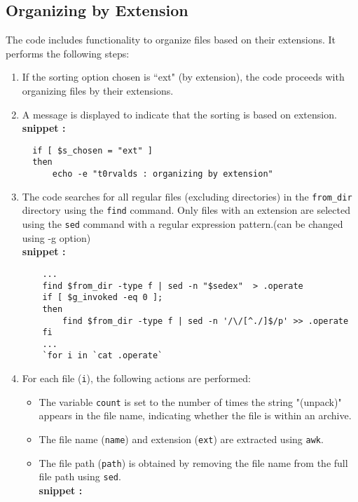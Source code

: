 \documentclass[12pt]{article}
\begin{document}
    \subsection{Organizing by Extension}\label{orgExt}
\begin{flushleft}
The code includes functionality to organize files based on their extensions. It performs the following steps:

    \begin{enumerate}
    \item If the sorting option chosen is ``ext" (by extension), the code proceeds with organizing files by their extensions.
    \item A message is displayed to indicate that the sorting is based on extension.
    \\\textbf{snippet :}
    \begin{verbatim}
  if [ $s_chosen = "ext" ]
  then
      echo -e "t0rvalds : organizing by extension"
    \end{verbatim}    
    \item The code searches for all regular files (excluding directories) in the \texttt{from\_dir} directory using the \texttt{find} command. Only files with an extension are selected using the \texttt{sed} command with a regular expression pattern.(can be changed using -g option)
    \\\textbf{snippet :}
    \begin{verbatim}
    ...
    find $from_dir -type f | sed -n "$sedex"  > .operate
    if [ $g_invoked -eq 0 ];
    then
        find $from_dir -type f | sed -n '/\/[^./]$/p' >> .operate
    fi
    ...
    `for i in `cat .operate`
    \end{verbatim}
    \item For each file (\texttt{i}), the following actions are performed:
        \begin{itemize}
            \item The variable \texttt{count} is set to the number of times the string "(unpack)" appears in the file name, indicating whether the file is within an archive.
            \item The file name (\texttt{name}) and extension (\texttt{ext}) are extracted using \texttt{awk}.
            \item The file path (\texttt{path}) is obtained by removing the file name from the full file path using \texttt{sed}.
      \\\textbf{snippet :}
      \begin{verbatim}

\end{verbatim}
\end{itemize}
\end{enumerate}
\end{flushleft}
\end{document}
